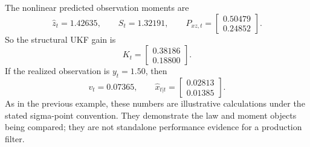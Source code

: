 The nonlinear predicted observation moments are
\[
  \hat z_t = 1.42635,
  \qquad
  S_t = 1.32191,
  \qquad
  P_{xz,t}
  =
  \begin{bmatrix}
    0.50479\\ 0.24852
  \end{bmatrix}.
\]
So the structural UKF gain is
\[
  K_t
  =
  \begin{bmatrix}
    0.38186\\ 0.18800
  \end{bmatrix}.
\]
If the realized observation is $y_t=1.50$, then
\[
  v_t = 0.07365,
  \qquad
  \hat x_{t|t}
  =
  \begin{bmatrix}
    0.02813\\ 0.01385
  \end{bmatrix}.
\]
As in the previous example, these numbers are illustrative calculations under
the stated sigma-point convention.  They demonstrate the law and moment objects
being compared; they are not standalone performance evidence for a production
filter.

